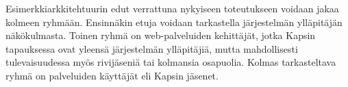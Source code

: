 Esimerkkiarkkitehtuurin edut verrattuna nykyiseen toteutukseen voidaan jakaa kolmeen ryhmään. Ensinnäkin etuja voidaan tarkastella järjestelmän ylläpitäjän näkökulmasta. Toinen ryhmä on web-palveluiden kehittäjät, jotka Kapsin tapauksessa ovat yleensä järjestelmän ylläpitäjiä, mutta mahdollisesti tulevaisuudessa myös rivijäseniä tai kolmansia osapuolia. Kolmas tarkasteltava ryhmä on palveluiden käyttäjät eli Kapsin jäsenet.